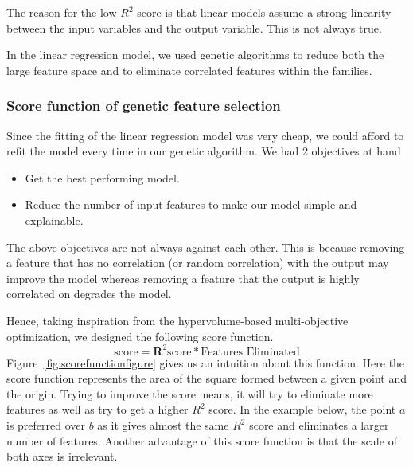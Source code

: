\documentclass[11pt]{article}
\begin{document}
The reason for the low $R^2$ score is that linear models assume a strong linearity between the input variables and the output variable.
This is not always true.

In the linear regression model,  we used genetic algorithms to reduce both the large feature space and to eliminate correlated features within the families. 

\subsubsection{Score function of genetic feature selection}
\label{GenerationScoringFunction}
Since the fitting of the linear regression model was very cheap, we could afford to refit the model every time in our genetic algorithm.
We had 2 objectives at hand
\begin{itemize}
\item Get the best performing model.
\item Reduce the number of input features to make our model simple and explainable.
\end{itemize}
The above objectives are not always against each other.
This is because removing a feature that has no correlation (or random correlation) with the output may improve the model whereas removing a feature that the output is highly correlated on degrades the model.


Hence,  taking inspiration from the hypervolume-based multi-objective optimization, we designed the following score function.
$$
\textrm{score} = \mathbf{R}^2 \textrm{score} * \textrm{Features Eliminated}
$$
Figure~\ref{fig:scorefunctionfigure} gives us an intuition about this function.
Here the score function represents the area of the square formed between a given point and the origin.
Trying to improve the score means,  it will try to eliminate more features as well as try to get a higher $R^2$ score.
In the example below,  the point $a$ is preferred over $b$ as it gives almost the same $R^2$ score and eliminates a larger number of features.
Another advantage of this score function is that the scale of both axes is irrelevant.
\end{document}
